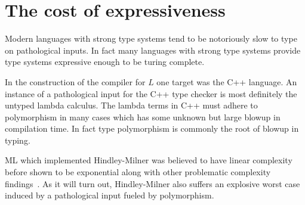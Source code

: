 \documentclass[11pt,oneside,a4paper]{report}
\begin{document}
\section{The cost of expressiveness}
Modern languages with strong type systems tend to be notoriously slow to type on pathological inputs.
In fact many languages with strong type systems provide type systems expressive enough to be turing complete.

In the construction of the compiler for $L$ one target was the C++ language.
An instance of a pathological input for the C++ type checker is most definitely the untyped lambda calculus.
The lambda terms in C++ must adhere to polymorphism in many cases which has some unknown but large blowup in compilation time.
In fact type polymorphism is commonly the root of blowup in typing.

ML which implemented Hindley-Milner was believed to have linear complexity before shown to be exponential along with other problematic complexity findings~\cite{mairson1989deciding}.
As it will turn out, Hindley-Milner also suffers an explosive worst case induced by a pathological input fueled by polymorphism.
\end{document}

